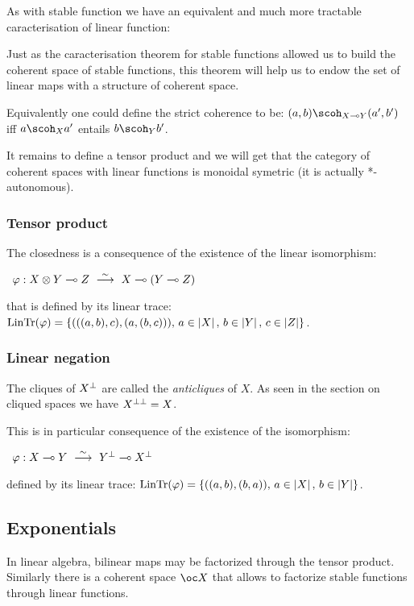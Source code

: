 As with stable function we have an equivalent and much more tractable
caracterisation of linear function:

Just as the caracterisation theorem for stable functions allowed us to
build the coherent space of stable functions, this theorem will help us
to endow the set of linear maps with a structure of coherent space.

Equivalently one could define the strict coherence to be:
\((a,b)\scoh_{X\limp Y}(a',b')\) iff \(a\scoh_X a'\) entails
\(b\scoh_Y b'\).

It remains to define a tensor product and we will get that the category
of coherent spaces with linear functions is monoidal symetric (it is
actually *-autonomous).

\subsubsection{Tensor product}\label{tensor-product}

The closedness is a consequence of the existence of the linear
isomorphism:

\texttt{~}\(\varphi:X\tens Y\limp Z\ \stackrel{\sim}{\longrightarrow}\ X\limp(Y\limp Z)\)

that is defined by its linear trace:
\(\mathrm{LinTr}(\varphi) = \{(((a, b), c), (a, (b, c))),\, a\in\left|X\right|,\, b\in \left|Y\right|,\, c\in\left|Z\right|\}\).

\subsubsection{Linear negation}\label{linear-negation}

The cliques of \(X^\bot\) are called the \emph{anticliques} of \(X\). As
seen in the section on cliqued spaces we have \(X^{\bot\bot}=X\).

This is in particular consequence of the existence of the isomorphism:

\texttt{~}\(\varphi:X\limp Y\ \stackrel{\sim}{\longrightarrow}\ Y\orth\limp X\orth\)

defined by its linear trace:
\(\mathrm{LinTr}(\varphi) = \{((a, b), (b, a)),\, a\in\left|X\right|,\, b\in\left|Y\right|\}\).

\subsection{Exponentials}\label{exponentials}

In linear algebra, bilinear maps may be factorized through the tensor
product. Similarly there is a coherent space \(\oc X\) that allows to
factorize stable functions through linear functions.

